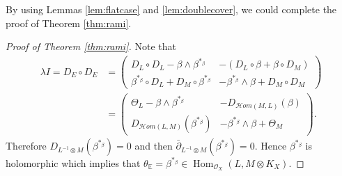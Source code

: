 \documentclass[12pt]{article}
\begin{document}
By using  Lemmas \ref{lem:flatcase} and \ref{lem:doublecover}, we could complete the proof of Theorem \ref{thm:rami}.
\begin{proof}[Proof of Theorem \ref{thm:rami}]
Note that
\begin{equation*}
\label{equ:curvature}
\begin{split}
\lambda I = D_{E} \circ D_{E} &= \begin{pmatrix}
D_{L} \circ D_{L} - \beta \wedge \beta^{*_{\beta}} & - \left(D_{L} \circ \beta + \beta \circ D_{M}\right) \\
\beta^{*_{\beta}} \circ D_{L} + D_{M} \circ \beta^{*_{\beta}} & -\beta^{*_{\beta}} \wedge \beta + D_{M} \circ D_{M}
\end{pmatrix} \\
&= \begin{pmatrix}
\Theta_{L} - \beta \wedge \beta^{*_{\beta}} & -D_{\mathcal{H}om(M, L)} (\beta)\\
D_{\mathcal{H}om(L, M)}(\beta^{*_{\beta}}) & -\beta^{*_{\beta}} \wedge \beta + \Theta_{M}
\end{pmatrix}.
\end{split}
\end{equation*}
Therefore $D_{L^{-1} \otimes M}(\beta^{*_{\beta}}) = 0$ and then $\bar{\partial}_{L^{-1} \otimes M}(\beta^{*_{\beta}}) = 0$. Hence $\beta^{*_{\beta}}$ is holomorphic which implies that $\theta_{\mathbb E} = \beta^{*_{\beta}} \in \operatorname{Hom}_{\mathcal O_{X}}(L, M \otimes K_{X})$.


\end{proof}
\end{document}
